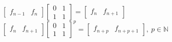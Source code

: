 \begin{itemize}

    $\begin{bmatrix} f_{n-1} & f_n \end{bmatrix}
     \begin{bmatrix} 0 & 1 \\ 1 & 1 \end{bmatrix} =
     \begin{bmatrix} f_n & f_{n+1} \end{bmatrix}$
    $\begin{bmatrix} f_n & f_{n+1} \end{bmatrix}
     {\begin{bmatrix} 0 & 1 \\ 1 & 1 \end{bmatrix}}^p =
     \begin{bmatrix} f_{n+p} & f_{n+p+1} \end{bmatrix},
     \ p \in \mathbb{N}$
 
\end{itemize}